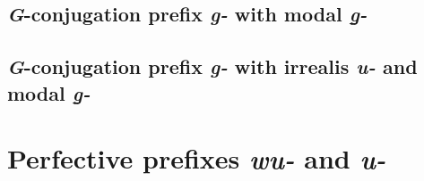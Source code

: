 \documentclass[12pt,letterpaper,landscape,oneside,article]{memoir}
\begin{document}
\subsection{\textit{G}-conjugation prefix \textit{g-} with modal \textit{g̱-}}

\subsection{\textit{G}-conjugation prefix \textit{g-} with irrealis \textit{u-} and modal \textit{g̱-}}

\clearpage

\section{Perfective prefixes \textit{wu-} and \textit{u-}}

\begin{multicols}{2}
\end{multicols}
\end{document}
